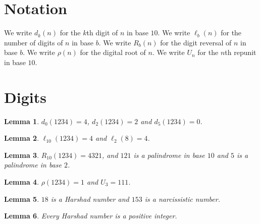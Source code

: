 \documentclass{article}
\newtheorem{lemma}{Lemma}
\begin{document}
\section{Notation}

We write $d_k(n)$ for the $k$th digit of $n$ in base $10$.
We write $\ell_b(n)$ for the number of digits of $n$ in base $b$.
We write $R_b(n)$ for the digit reversal of $n$ in base $b$.
We write $\rho(n)$ for the digital root of $n$.
We write $U_n$ for the $n$th repunit in base $10$.

\section{Digits}

\begin{lemma}\label{digits}
$d_0(1234)=4$, $d_2(1234)=2$ and $d_5(1234)=0$.
\end{lemma}

\begin{lemma}\label{length}
$\ell_{10}(1234)=4$ and $\ell_2(8)=4$.
\end{lemma}

\begin{lemma}\label{reversal}
$R_{10}(1234)=4321$, and $121$ is a palindrome in base $10$ and $5$ is a palindrome in base $2$.
\end{lemma}

\begin{lemma}\label{root}
$\rho(1234)=1$ and $U_3=111$.
\end{lemma}

\begin{lemma}\label{special}
$18$ is a Harshad number and $153$ is a narcissistic number.
\end{lemma}

\begin{lemma}\label{harshad}
Every Harshad number is a positive integer.
\end{lemma}
\end{document}
